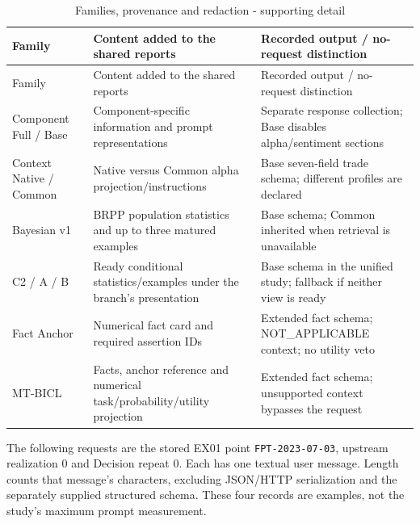 \begin{longtable}[]{@{}
  >{\raggedright\arraybackslash}p{}
  >{\raggedright\arraybackslash}p{}
  >{\raggedright\arraybackslash}p{}@{}}
\caption{Families, provenance and redaction - supporting detail}\label{tab:B_prompts:1}\tabularnewline
\toprule\noalign{}
Family
 & Content added to the shared reports
 & Recorded output / no-request distinction
 \\
\midrule\noalign{}
\endfirsthead
\toprule\noalign{}
Family
 & Content added to the shared reports
 & Recorded output / no-request distinction
 \\
\midrule\noalign{}
\endhead
\bottomrule\noalign{}
\endlastfoot
Component Full / Base & Component-specific information and prompt representations & Separate response collection; Base disables alpha/sentiment sections \\
Context Native / Common & Native versus Common alpha projection/instructions & Base seven-field trade schema; different profiles are declared \\
Bayesian v1 & BRPP population statistics and up to three matured examples & Base schema; Common inherited when retrieval is unavailable \\
C2 / A / B & Ready conditional statistics/examples under the branch's presentation & Base schema in the unified study; fallback if neither view is ready \\
Fact Anchor & Numerical fact card and required assertion IDs & Extended fact schema; NOT\_\allowbreak{}APPLICABLE context; no utility veto \\
MT-BICL & Facts, anchor reference and numerical task/probability/utility projection & Extended fact schema; unsupported context bypasses the request \\
\end{longtable}

\endgroup

The following requests are the stored EX01 point \texttt{FPT-\allowbreak{}2023-\allowbreak{}07-\allowbreak{}03},
upstream realization 0 and Decision repeat 0. Each has one textual user
message. Length counts that message's characters, excluding JSON/HTTP
serialization and the separately supplied structured schema. These four
records are examples, not the study's maximum prompt measurement.

\begingroup
\small
{}
\setlength{\tabcolsep}{3pt}

